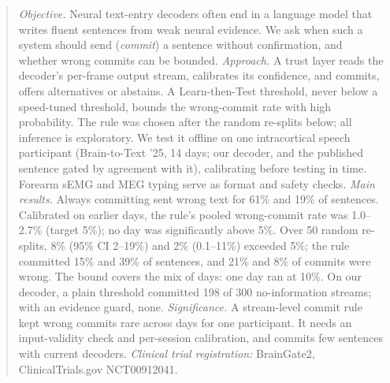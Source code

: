 \begin{abstract}
\noindent\textit{Objective.} Neural text-entry decoders often end in a language model that writes fluent sentences from weak neural evidence. We ask when such a system should send (\emph{commit}) a sentence without confirmation, and whether wrong commits can be bounded.
\textit{Approach.} A trust layer reads the decoder's per-frame output stream, calibrates its confidence, and commits, offers alternatives or abstains. A Learn-then-Test threshold, never below a speed-tuned threshold, bounds the wrong-commit rate with high probability. The rule was chosen after the random re-splits below; all inference is exploratory. We test it offline on one intracortical speech participant (Brain-to-Text '25, 14 days; our decoder, and the published sentence gated by agreement with it), calibrating before testing in time. Forearm sEMG and MEG typing serve as format and safety checks.
\textit{Main results.} Always committing sent wrong text for 61\% and 19\% of sentences. Calibrated on earlier days, the rule's pooled wrong-commit rate was 1.0--2.7\% (target 5\%); no day was significantly above 5\%. Over 50 random re-splits, 8\% (95\% CI 2--19\%) and 2\% (0.1--11\%) exceeded 5\%; the rule committed 15\% and 39\% of sentences, and 21\% and 8\% of commits were wrong. The bound covers the mix of days: one day ran at 10\%. On our decoder, a plain threshold committed 198 of 300 no-information streams; with an evidence guard, none.
\textit{Significance.} A stream-level commit rule kept wrong commits rare across days for one participant. It needs an input-validity check and per-session calibration, and commits few sentences with current decoders.
\textit{Clinical trial registration:} BrainGate2, ClinicalTrials.gov NCT00912041.
\end{abstract}
